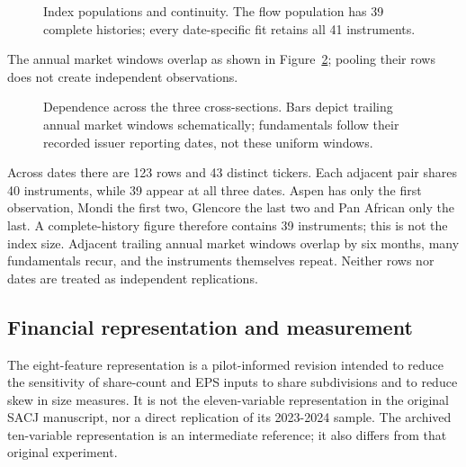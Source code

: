 \begin{figure}[htbp]
\centering
{}
\caption{Index populations and continuity. The flow population has 39 complete histories; every date-specific fit retains all 41 instruments.}\label{fig:population}
\end{figure}


The annual market windows overlap as shown in Figure~\ref{fig:windows}; pooling their rows does not create independent observations.


\begin{figure}[htbp]
\centering
{}
\caption{Dependence across the three cross-sections. Bars depict trailing annual market windows schematically; fundamentals follow their recorded issuer reporting dates, not these uniform windows.}\label{fig:windows}
\end{figure}


Across dates there are 123 rows and 43 distinct tickers. Each adjacent pair shares 40 instruments, while 39 appear at all three dates. Aspen has only the first observation, Mondi the first two, Glencore the last two and Pan African only the last. A complete-history figure therefore contains 39 instruments; this is not the index size. Adjacent trailing annual market windows overlap by six months, many fundamentals recur, and the instruments themselves repeat. Neither rows nor dates are treated as independent replications.


\subsection{Financial representation and measurement}

The eight-feature representation is a pilot-informed revision intended to reduce the sensitivity of share-count and EPS inputs to share subdivisions and to reduce skew in size measures. It is not the eleven-variable representation in the original SACJ manuscript, nor a direct replication of its 2023-2024 sample. The archived ten-variable representation is an intermediate reference; it also differs from that original experiment.


